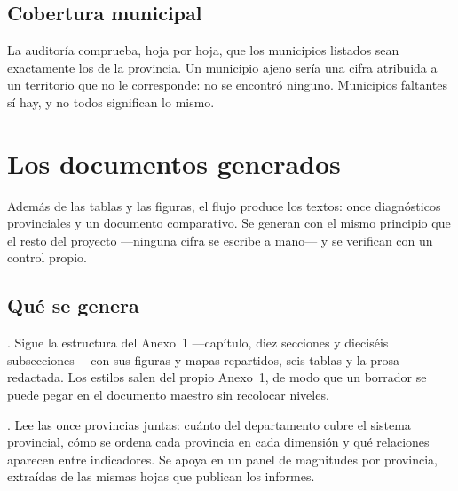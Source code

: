 \documentclass[11pt,a4paper]{article}
\begin{document}
\subsection{Cobertura municipal}

La auditoría comprueba, hoja por hoja, que los municipios listados sean
exactamente los de la provincia. Un municipio ajeno sería una cifra atribuida a
un territorio que no le corresponde: no se encontró ninguno. Municipios
faltantes sí hay, y no todos significan lo mismo.

\begin{table}[htbp]\centering
\caption{Hojas donde falta la fila de algún municipio}
\small

\end{table}

\section{Los documentos generados}
\label{sec:documentos}

Además de las tablas y las figuras, el flujo produce los textos: once
diagnósticos provinciales y un documento comparativo. Se generan con el mismo
principio que el resto del proyecto —ninguna cifra se escribe a mano— y se
verifican con un control propio.

\subsection{Qué se genera}

\begin{description}[leftmargin=*, style=nextline, itemsep=3pt]
  \item[Diagnóstico provincial] . Sigue
    la estructura del Anexo~1 —capítulo, diez secciones y dieciséis
    subsecciones— con sus \cifraFiguras{} figuras y mapas repartidos, seis
    tablas y la prosa redactada. Los estilos salen del propio Anexo~1, de modo
    que un borrador se puede pegar en el documento maestro sin recolocar
    niveles.
  \item[Comparativo de las once] . Lee las once
    provincias juntas: cuánto del departamento cubre el sistema provincial, cómo
    se ordena cada provincia en cada dimensión y qué relaciones aparecen entre
    indicadores. Se apoya en un panel de \cifraPanelIndicadores{} magnitudes por
    provincia, extraídas de las mismas hojas que publican los informes.
\end{description}
\end{document}
